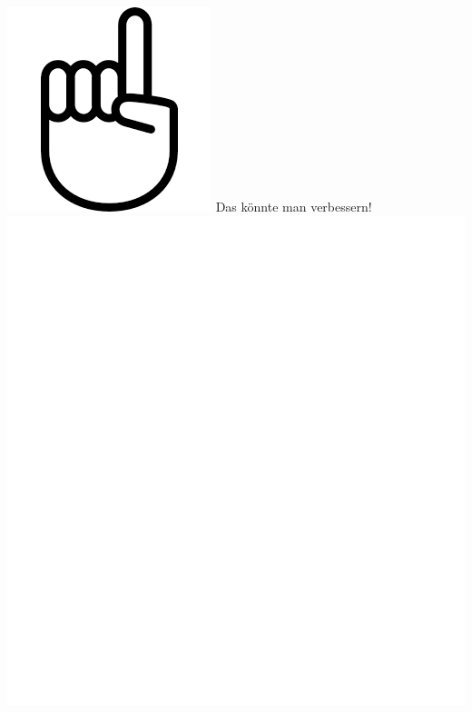 \documentclass[oneside,openany,headings=optiontotoc,11pt,numbers=noenddot]{scrreprt}
\begin{document}
	\begin{framed}
		\noindent
		\includegraphics[scale=0.1]{fing.png} \tiny{\color{codegray}Das könnte man verbessern!}\\
		\includegraphics[scale=0.15]{empty.jpg}
	\end{framed}
	\par\bigskip\noindent
\end{document}
